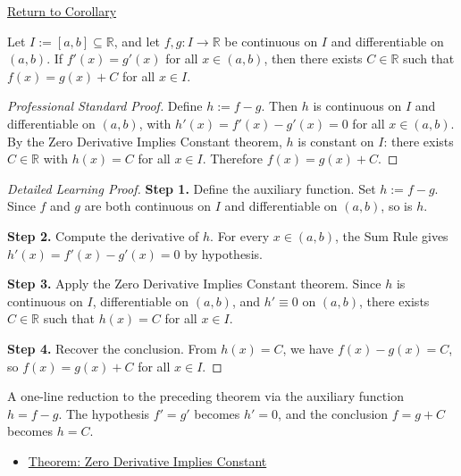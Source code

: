 \newpage
{}
\label{prf:equal-derivatives-constant-difference}

\begin{remark*}[Return]
\hyperref[cor:equal-derivatives-constant-difference]{Return to Corollary}
\end{remark*}

\begin{corollary*}
Let $I := [a,b] \subseteq \mathbb{R}$, and let $f, g : I \to \mathbb{R}$ be continuous on $I$ and differentiable on $(a,b)$. If $f'(x) = g'(x)$ for all $x \in (a,b)$, then there exists $C \in \mathbb{R}$ such that $f(x) = g(x) + C$ for all $x \in I$.
\end{corollary*}

\begin{proof}[Professional Standard Proof]
\LRAProofBodyStart
Define $h := f - g$. Then $h$ is continuous on $I$ and differentiable on $(a,b)$, with $h'(x) = f'(x) - g'(x) = 0$ for all $x \in (a,b)$. By the Zero Derivative Implies Constant theorem, $h$ is constant on $I$: there exists $C \in \mathbb{R}$ with $h(x) = C$ for all $x \in I$. Therefore $f(x) = g(x) + C$.
\end{proof}

\begin{proof}[Detailed Learning Proof]
\LRAProofBodyStart

\textbf{Step 1.} Define the auxiliary function. Set $h := f - g$. Since $f$ and $g$ are both continuous on $I$ and differentiable on $(a,b)$, so is $h$.

\textbf{Step 2.} Compute the derivative of $h$. For every $x \in (a,b)$, the Sum Rule gives $h'(x) = f'(x) - g'(x) = 0$ by hypothesis.

\textbf{Step 3.} Apply the Zero Derivative Implies Constant theorem. Since $h$ is continuous on $I$, differentiable on $(a,b)$, and $h' \equiv 0$ on $(a,b)$, there exists $C \in \mathbb{R}$ such that $h(x) = C$ for all $x \in I$.

\textbf{Step 4.} Recover the conclusion. From $h(x) = C$, we have $f(x) - g(x) = C$, so $f(x) = g(x) + C$ for all $x \in I$.
\end{proof}

\begin{remark*}
A one-line reduction to the preceding theorem via the auxiliary function $h = f - g$. The hypothesis $f' = g'$ becomes $h' = 0$, and the conclusion $f = g + C$ becomes $h = C$.
\end{remark*}

\begin{dependencies}
\begin{itemize}
  \item \hyperref[thm:zero-derivative-implies-constant]{Theorem: Zero Derivative Implies Constant}
\end{itemize}
\end{dependencies}

\clearpage
